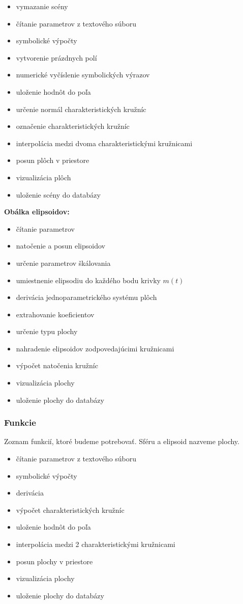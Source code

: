 \begin{itemize}
	\item vymazanie scény
    \item čítanie parametrov z textového súboru
    \item symbolické výpočty
    \item vytvorenie prázdnych polí
    \item numerické vyčíslenie symbolických výrazov
    \item uloženie hodnôt do poľa
    \item určenie normál charakteristických kružníc
    \item označenie charakteristických kružníc
    \item interpolácia medzi dvoma charakteristickými kružnicami
    \item posun plôch v priestore
    \item vizualizácia plôch
    \item uloženie scény do databázy
\end{itemize}

\textbf{Obálka elipsoidov:}
\begin{itemize}
	\item čítanie parametrov
    \item natočenie a posun elipsoidov
    \item určenie parametrov škálovania
    \item umiestnenie elipsodiu do každého bodu krivky $m(t)$
    \item derivácia jednoparametrického systému plôch 
    \item extrahovanie koeficientov
    \item určenie typu plochy
    \item nahradenie elipsoidov zodpovedajúcimi kružnicami
    \item výpočet natočenia kružníc
    \item vizualizácia plochy
    \item uloženie plochy do databázy
\end{itemize}
\subsubsection{Funkcie} 
Zoznam funkcií, ktoré budeme potrebovať. Sféru a elipsoid nazveme plochy.
\begin{itemize}
    \item čítanie parametrov z textového súboru
    \item symbolické výpočty
    \item derivácia
    \item výpočet charakteristických kružníc
    \item uloženie hodnôt do poľa
    \item interpolácia medzi 2 charakteristickými kružnicami
    \item posun plochy v priestore
    \item vizualizácia plochy
    \item uloženie plochy do databázy
\end{itemize}
